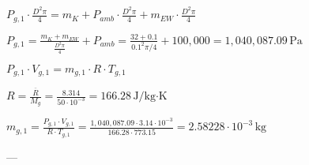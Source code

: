 \( P_{g,1} \cdot \frac{D^2 \pi}{4} = m_K + P_{amb} \cdot \frac{D^2 \pi}{4} + m_{EW} \cdot \frac{D^2 \pi}{4} \)  

\( P_{g,1} = \frac{m_K + m_{EW}}{\frac{D^2 \pi}{4}} + P_{amb} = \frac{32 + 0.1}{0.1^2 \pi / 4} + 100,000 = 1,040,087.09 \, \text{Pa} \)  

\( P_{g,1} \cdot V_{g,1} = m_{g,1} \cdot R \cdot T_{g,1} \)  

\( R = \frac{\overline{R}}{M_g} = \frac{8.314}{50 \cdot 10^{-3}} = 166.28 \, \text{J/kg·K} \)  

\( m_{g,1} = \frac{P_{g,1} \cdot V_{g,1}}{R \cdot T_{g,1}} = \frac{1,040,087.09 \cdot 3.14 \cdot 10^{-3}}{166.28 \cdot 773.15} = 2.58228 \cdot 10^{-3} \, \text{kg} \)  

---